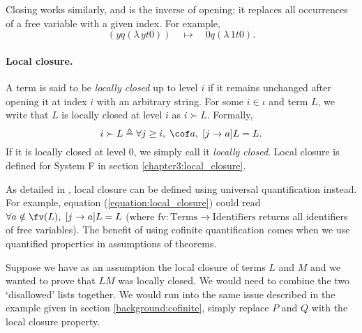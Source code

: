 Closing works similarly, and is the inverse of opening; it replaces all occurrences of a free
variable with a given index. For example,
\begin{equation*}
  [0 \leftarrow y] (y q (\lambda \, y t 0)) \quad \mapsto \quad 0 q (\lambda \, 1 t 0).
\end{equation*}

\paragraph*{Local closure.} A term is said to be \textit{locally closed} up to level $i$ if it
remains unchanged after opening it at index $i$ with an arbitrary string. For some $i \in \iota$ and
term $L$, we write that $L$ is locally closed at level $i$ as $i \succ L$. Formally,
\begin{equation}
  \label{equation:local_closure}
  i \succ L \triangleq \forall j \geq i, \; \cof a , \; [j \to a] L = L.
\end{equation}
If it is locally closed at level $0$, we simply call it \textit{locally closed}. Local closure is
defined for System F in section \ref{chapter3:local_closure}.

As detailed in \citet{aydemir_engineering_2008}, local closure can be defined using universal
quantification instead. For example, equation (\ref{equation:local_closure}) could read $\forall a
\notin \fv(L), \; [j \to a] L = L$ (where $\text{fv} \colon \text{Terms} \to \text{Identifiers}$
returns all identifiers of free variables). The benefit of using cofinite quantification comes when
we use quantified properties in assumptions of theorems.

Suppose we have as an assumption the local closure of terms $L$ and $M$ and we wanted to prove that
$LM$ was locally closed. We would need to combine the two `disallowed' lists together. We would run
into the same issue described in the example given in section \ref{background:cofinite}, simply
replace $P$ and $Q$ with the local closure property.

